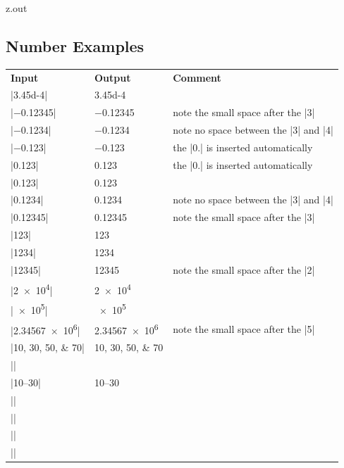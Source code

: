 \begin{VerbatimOut}{z.out}

\subsection{Number Examples}

{
  \noindent
  \hspace*{2\parindent}\begin{tabular}{@{}lll@{}}
    \textbf{Input}& \textbf{Output}& \textbf{Comment}\\
    \tabularspace
    |\num{3.45d-4}|&         \num{3.45d-4}\\
    |\num{-0.12345}|&        \num{-0.12345}&               note the small space after the |3|\\
    |\num{-0.1234}|&         \num{-0.1234}&                note no space between the |3| and |4|\\
    |\num{-.123}|&           \num{-.123}&                  the |0.| is inserted automatically\\
    |\num{.123}|&            \num{.123}&                   the |0.| is inserted automatically\\
    |\num{0.123}|&           \num{0.123}\\
    |\num{0.1234}|&          \num{0.1234}&                 note no space between the |3| and |4|\\
    |\num{0.12345}|&         \num{0.12345}&                note the small space after the |3|\\
    |\num{123}|&             \num{123}\\
    |\num{1234}|&            \num{1234}\\
    |\num{12345}|&           \num{12345}&                  note the small space after the |2|\\
    |\num{2e4}|&             \num{2e4}\\
    |\num{e5}|&              \num{e5}\\
    |\num{2.34567e6}|&       \num{2.34567e6}&              note the small space after the |5|\\[6pt]
    |\numlist{10;30;50;70}|& \numlist{10;30;50;70}\\[6pt]
    |\numproduct{10 x 20}|&  \numproduct{10 x 20}\\[6pt]
    |\numrange{10}{30}|&     \numrange{10}{30}\\[6pt]
    |\complexnum{-4}|&       \complexnum{-4}\\
    |\complexnum{-3-2i}|&    \complexnum{-3-2i}\\
    |\complexnum{2+3i}|&     \complexnum{2+3i}\\
    |\complexnum{4+-5i}|&    \complexnum{4+-5i}\\
  \end{tabular}
}
\end{VerbatimOut}

